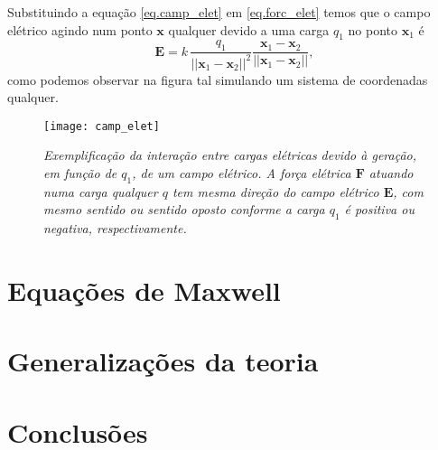 Substituindo a equação \ref{eq.camp_elet} em \ref{eq.forc_elet} temos que o campo elétrico agindo num ponto $\textbf{x}$ qualquer devido a uma carga $q_1$ no ponto $\textbf{x}_1$ é
\begin{equation*}
\textbf{E}=k\,\frac{q_1}{||\textbf{x}_1-\textbf{x}_2||^2}\frac{\textbf{x}_1-\textbf{x}_2}{||\textbf{x}_1-\textbf{x}_2||},
\end{equation*}
como podemos observar na figura tal simulando um sistema de coordenadas qualquer.
\begin{figure}
\centering
\texttt{[image: camp\_elet]}
\caption{\textit{Exemplificação da interação entre cargas elétricas devido à geração, em função de $q_1$, de um campo elétrico. A força elétrica $\textbf{F}$ atuando numa carga qualquer $q$ tem mesma direção do campo elétrico $\textbf{E}$, com mesmo sentido ou sentido oposto conforme a carga $q_1$ é positiva ou negativa, respectivamente.}}
\label{fig.camp_eletr}
\end{figure}

\begin{figure}[!htb]
\centering
{}
\caption{}
\label{fig.mossul}
\end{figure}


\section{Equações de Maxwell}

\section{Generalizações da teoria}

\section{Conclusões}